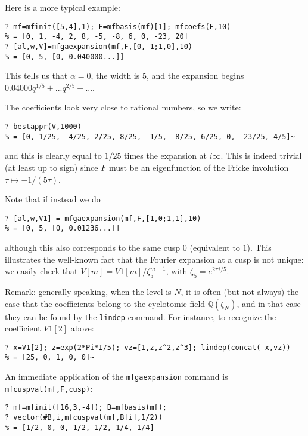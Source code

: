 \documentclass[11pt]{article}
\newcommand{\Q}{{\mathbb Q}}
\newcommand{\z}{\zeta}
\def\kbd#1{{\tt #1}}
\begin{document}
\smallskip

Here is a more typical example:

\begin{verbatim}
? mf=mfinit([5,4],1); F=mfbasis(mf)[1]; mfcoefs(F,10)
% = [0, 1, -4, 2, 8, -5, -8, 6, 0, -23, 20]
? [al,w,V]=mfgaexpansion(mf,F,[0,-1;1,0],10)
% = [0, 5, [0, 0.040000...]]
\end{verbatim}

This tells us that $\alpha=0$, the width is $5$, and the expansion
begins $0.04000q^{1/5}+...q^{2/5}+...$.

The coefficients look very close to rational numbers, so we write:

\begin{verbatim}
? bestappr(V,1000)
% = [0, 1/25, -4/25, 2/25, 8/25, -1/5, -8/25, 6/25, 0, -23/25, 4/5]~
\end{verbatim}

and this is clearly equal to $1/25$ times the expansion at $i\infty$.
This is indeed trivial (at least up to sign) since $F$ must be an
eigenfunction of the Fricke involution $\tau\mapsto-1/(5\tau)$.

Note that if instead we do

\begin{verbatim}
? [al,w,V1] = mfgaexpansion(mf,F,[1,0;1,1],10)
% = [0, 5, [0, 0.01236...]]
\end{verbatim}

although this also corresponds to the same cusp $0$ (equivalent to $1$).
This illustrates the well-known fact that the Fourier expansion at a cusp
is not unique: we easily check that $V[m]=V1[m]/\z_5^{m-1}$, with
$\z_5=e^{2\pi i/5}$.
  
Remark: generally speaking, when the level is $N$, it is often
(but not always) the case that the coefficients belong to the cyclotomic
field $\Q(\z_N)$, and in that case they can be found by the \kbd{lindep}
command. For instance, to recognize the coefficient $V1[2]$ above:

\begin{verbatim}
? x=V1[2]; z=exp(2*Pi*I/5); vz=[1,z,z^2,z^3]; lindep(concat(-x,vz))
% = [25, 0, 1, 0, 0]~
\end{verbatim}

\medskip

An immediate application of the \kbd{mfgaexpansion} command is
\kbd{mfcuspval(mf,F,cusp)}:

\begin{verbatim}
? mf=mfinit([16,3,-4]); B=mfbasis(mf);
? vector(#B,i,mfcuspval(mf,B[i],1/2))
% = [1/2, 0, 0, 1/2, 1/2, 1/4, 1/4]
\end{verbatim}
\end{document}
